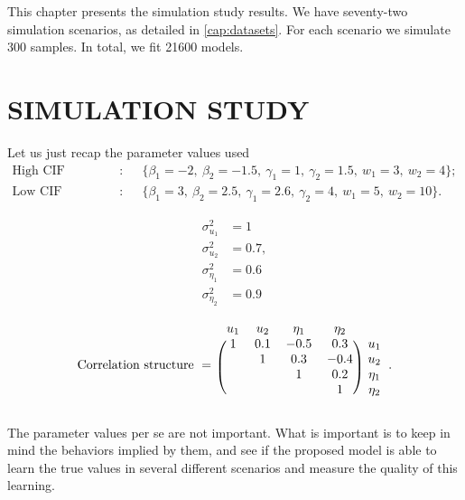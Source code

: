 This chapter presents the simulation study results. We have seventy-two
simulation scenarios, as detailed in \autoref{cap:datasets}. For each
scenario we simulate 300 samples. In total, we fit 21600 models.

\section{SIMULATION STUDY}
\label{cap:simures}

Let us just recap the parameter values used
\begin{align*}
 \text{High CIF configuration}:~&\quad
 \{\beta_{1} = -2,~\beta_{2} = -1.5,~\gamma_{1} = 1,~\gamma_{2} = 1.5,~
   w_{1} = 3,~w_{2} = 4
 \};\\
 \text{Low CIF configuration}:~&\quad
 \{\beta_{1} = 3,~\beta_{2} = 2.5,~\gamma_{1} = 2.6,~\gamma_{2} = 4,~
   w_{1} = 5,~w_{2} = 10
 \}.
\end{align*}
\begin{minipage}{0.15\textwidth}
 \begin{align*}
  \sigma_{u_{1}}^{2}   &= 1\\
  \sigma_{u_{2}}^{2}   &= 0.7,\\
  \sigma_{\eta_{1}}^{2} &= 0.6\\
  \sigma_{\eta_{2}}^{2} &= 0.9
 \end{align*}
\end{minipage}%
\begin{minipage}{0.85\textwidth}
 \[
  \text{Correlation structure}~=~\begin{blockarray}{ccccc}
                                  u_{1} & u_{2} & \eta_{1} & \eta_{2}\\
                                  \begin{block}{(cccc)c}
                                   1 & 0.1 & -0.5 &  0.3 & u_{1}\\
                                     &   1 &  0.3 & -0.4 & u_{2}\\
                                     &     &    1 &  0.2 & \eta_{1}\\
                                     &     &      &    1 & \eta_{2}\\
                                  \end{block}
                                 \end{blockarray}.
 \]
\end{minipage}

\vspace{0.3cm}
\noindent
The parameter values per se are not important. What is important is to
keep in mind the behaviors implied by them, and see if the proposed
model is able to learn the true values in several different scenarios
and measure the quality of this learning.

